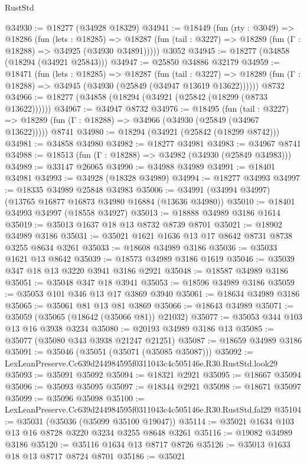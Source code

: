 \begin{lexlean}{RustStd}
\begin{coremodule}
@34930 := @18277 (@34928 @18329)
@34941 := @18449
    (fun (rty : @3049) =>
    @18286
      (fun (lets : @18285) =>
      @18287 (fun (tail : @3227) => @18289 (fun (Γ : @18288) => @34925 (@34930 @34891)))))
    @3052
@34945 := @18277 (@34858 (@18294 (@34921 @25843)))
@34947 := @25850 @34886 @32179
@34959 := @18471
    (fun (lets : @18285) =>
    @18287
      (fun (tail : @3227) =>
      @18289 (fun (Γ : @18288) => @34945 (@34930 (@25849 (@34947 @13619 @13622))))))
    @8732
@34966 := @18277 (@34858 (@18294 (@34921 (@25842 (@18299 (@8733 @13622))))))
@34967 := @34947 @8732
@34976 := @18495
    (fun (tail : @3227) => @18289 (fun (Γ : @18288) => @34966 (@34930 (@25849 (@34967 @13622)))))
    @8741
@34980 := @18294 (@34921 (@25842 (@18299 @8742)))
@34981 := @34858 @34980
@34982 := @18277 @34981
@34983 := @34967 @8741
@34988 := @18513 (fun (Γ : @18288) => @34982 (@34930 (@25849 @34983)))
@34989 := @33147 @26065
@34990 := @34988 @34989
@34991 := @18401 @34981
@34993 := @34928 (@18328 @34989)
@34994 := @18277 @34993
@34997 := @18335 @34989 @25848 @34983
@35006 := @34991 (@34994 @34997) (@13765 @16877 @16873 @34980 @16884 (@13636 @34980))
@35010 := @18401 @34993 @34997 (@18558 @34927)
@35013 := @18888 @34989 @3186 @1614
@35019 := @35013 @1637 @18 @13 @8732 @8739 @8701
@35021 := @18902 @34989 @3186
@35031 := @35021 @1621 @1636 @13 @17 @8642 @8731 @8738 @3255 @8634 @3261
@35033 := @18608 @34989 @3186
@35036 := @35033 @1621 @13 @8642
@35039 := @18573 @34989 @3186 @1619
@35046 := @35039 @347 @18 @13 @3220 @3941 @3186 @2921
@35048 := @18587 @34989 @3186
@35051 := @35048 @347 @18 @3941
@35053 := @18596 @34989 @3186
@35059 := @35053 @101 @346 @13 @17 @3869 @3940
@35061 := @18634 @34989 @3186
@35065 := @35061 @81 @13 @81 @3869
@35066 := @18643 @34989
@35071 := @35059 (@35065 (@18642 (@35066 @81)) @21032)
@35077 := @35053 @344 @103 @13 @16 @3938 @3234
@35080 := @20193 @34989 @3186 @13
@35085 := @35077 (@35080 @343 @3938 @21247 @21251)
@35087 := @18659 @34989 @3186
@35091 := @35046 (@35051 (@35071 (@35085 @35087)))
@35092 := LexLeanPreserve.Cc639d244984595f0311043c4c505146e.R30.RustStd.look29
@35093 := @35091 @35092
@35094 := @18321 @2921
@35095 := @18667 @35094
@35096 := @35093 @35095
@35097 := @18344 @2921
@35098 := @18671 @35097
@35099 := @35096 @35098
@35100 := LexLeanPreserve.Cc639d244984595f0311043c4c505146e.R30.RustStd.fal29
@35104 := @35031 (@35036 (@35099 @35100 @19047))
@35114 := @35021 @1634 @103 @13 @16 @8728 @3220 @3234 @3255 @8648 @3261
@35116 := @19082 @34989 @3186
@35120 := @35116 @1634 @13 @8717 @8726
@35126 := @35013 @1633 @18 @13 @8717 @8724 @8701
@35186 := @35021

\end{coremodule}
\end{lexlean}
